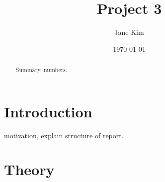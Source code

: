 \documentclass[prb,aps,twocolumn,showpacs,10pt]{revtex4-1}
\begin{document}
\title {Project 3}

\author{Jane Kim}
\date{\today}


\begin{abstract}

\vspace*{5mm}
\noindent Summary, numbers.
\end{abstract}

\maketitle

\section{Introduction}
motivation, explain structure of report.

\section{Theory}
\end{document}

